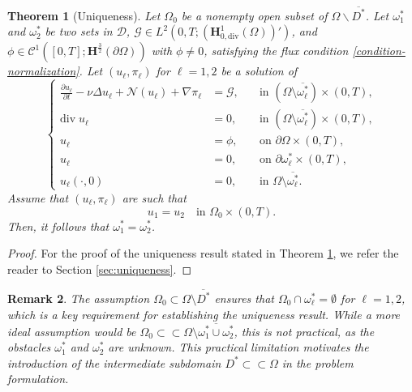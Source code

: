 \documentclass[a4paper,12pt,reqno,natbib]{amsart}
\newtheorem{theorem}{Theorem}
\newtheorem{remark}[theorem]{Remark}
\def\N{\mathcal N}
\def\H{\textbf{H}}
\begin{document}
  
\begin{theorem}[Uniqueness]\label{uniqueness} Let $\Omega_0$ be a nonempty open subset of $\Omega\backslash\overline{D^*}$.
Let $\omega_1^*$ and $\omega_2^*$ be two sets in $\mathcal{D}$, \( \mathcal{G} \in L^2(0,T; (\H^1_{0,\mathrm{div}}(\Omega))') \), and \( \phi \in  \mathcal{C}^1([0,T]; \H^{\frac{3}{2}}(\partial \Omega)) \) with $\phi\not=0$, satisfying the flux condition \eqref{condition-normalization}. Let \( (u_\ell, \pi_\ell) \) for \( \ell = 1,2 \) be a solution of 
    \begin{equation}\label{u-ell}
    \left\{
    \begin{array}{rll}
        \displaystyle \frac{\partial u_\ell}{\partial t} - \nu \Delta u_\ell + \N(u_\ell) + \nabla \pi_\ell
        &= \mathcal{G}, &\quad \text{in } (\Omega \setminus \overline{\omega^*_\ell}) \times (0, T), \\[8pt]
        \text{div}\; u_\ell &= 0, &\quad \text{in } (\Omega \setminus \overline{\omega^*_\ell}) \times (0, T), \\[8pt]
        u_\ell &= \phi, &\quad \text{on } \partial\Omega \times (0, T), \\[8pt]
        u_\ell &= 0, &\quad \text{on } \partial\omega^*_\ell \times (0, T), \\[8pt]
        u_\ell(\cdot,0) &= 0, &\quad \text{in } \Omega \setminus \overline{\omega^*_\ell}.
    \end{array}
    \right.
    \end{equation}
    Assume that \( (u_\ell, \pi_\ell) \) are such that
    \begin{equation}\label{obsevtion-condition-1}
      u_1 = u_2 \quad \text{in } \Omega_0 \times (0, T).   
    \end{equation}
    Then, it follows that \( \omega^*_1 = \omega^*_2 \).
\end{theorem}

\begin{proof}
    For the proof of the uniqueness result stated in Theorem \ref{uniqueness}, we refer the reader to Section \ref{sec:uniqueness}.
\end{proof}

\begin{remark}
The assumption \( \Omega_0 \subset \Omega \setminus \overline{D^*} \) ensures that \( \Omega_0 \cap \omega^*_\ell = \emptyset \) for \( \ell = 1, 2 \), which is a key requirement for establishing the uniqueness result. While a more ideal assumption would be \( \Omega_0 \subset\subset \Omega \setminus \overline{\omega^*_1 \cup \omega^*_2} \), this is not practical, as the obstacles \( \omega^*_1 \) and \( \omega^*_2 \) are unknown. This practical limitation motivates the introduction of the intermediate subdomain \( D^* \subset\subset \Omega \) in the problem formulation.
\end{remark}
\end{document}

